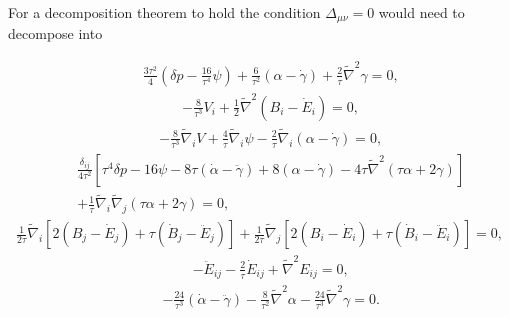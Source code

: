 For a decomposition theorem to hold the condition $\Delta_{\mu\nu}=0$ would need to decompose into 

%
\begin{eqnarray}
&&\frac{3\tau^2}{4}\left(\delta p -\frac{16}{\tau^4}\psi\right)
+\frac{6}{\tau^2}(\alpha-\dot{\gamma})+\frac{2}{\tau}\tilde{\nabla}^2\gamma=0,
\label{8.40}
\end{eqnarray}
%
\begin{eqnarray}
&&-\frac{8}{\tau^3}V_{i}+\frac{1}{2}\tilde{\nabla}^2(B_i-\dot{E}_i)=0,
\label{8.41}
\end{eqnarray}
%
%
\begin{eqnarray}
&&-\frac{8}{\tau^3}\tilde{\nabla}_iV+\frac{4}{\tau}\tilde{\nabla}_i\psi
-\frac{2}{\tau}\tilde{\nabla}_i(\alpha-\dot{\gamma})=0,
\label{8.42}
\end{eqnarray}
%
\begin{eqnarray}
&&\frac{\delta_{ij}}{4\tau^2}\left[\tau^4\delta p-16\psi-8\tau(\dot{\alpha}-\ddot{\gamma})+8(\alpha-\dot{\gamma})-4\tau \tilde{\nabla}^2(\tau\alpha+2\gamma)\right]
\nonumber\\
&&+\frac{1}{\tau}\tilde{\nabla}_i\tilde{\nabla}_j(\tau\alpha+2\gamma)=0,
\label{8.43}
\end{eqnarray}
%
\begin{eqnarray}
\frac{1}{2\tau}\tilde{\nabla}_i[2(B_j-\dot{E}_j)+\tau(\dot{B}_j-\ddot{E}_j)]
+\frac{1}{2\tau}\tilde{\nabla}_j[2(B_i-\dot{E}_i)+\tau(\dot{B}_i-\ddot{E}_i)]=0,
\label{8.44}
\end{eqnarray}
%
\begin{eqnarray}
&&-\ddot{E}_{ij}-\frac{2}{\tau}\dot{E}_{ij}+\tilde{\nabla}^2E_{ij}=0,
\label{8.45}
\end{eqnarray}
%
\begin{eqnarray}
&& -\frac{24}{\tau^3}(\dot{\alpha}-\ddot{\gamma})-\frac{8}{\tau^2}\tilde{\nabla}^2\alpha-\frac{24}{\tau^3}\tilde{\nabla}^2\gamma=0.
\label{8.46}
\end{eqnarray}
%

